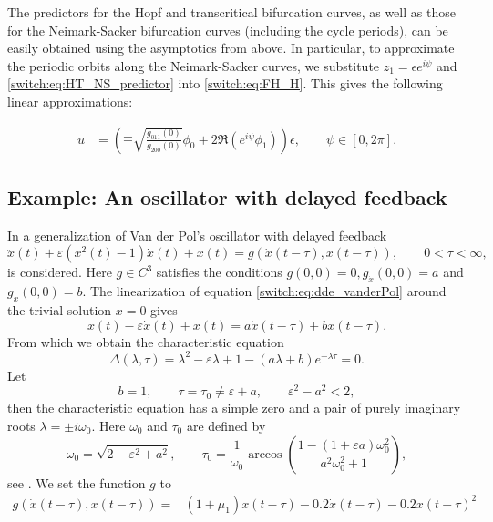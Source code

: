 \begin{subappendices}
The predictors for the Hopf and transcritical bifurcation curves, as well as
those for the Neimark-Sacker bifurcation curves (including the cycle periods),
can be easily obtained using the asymptotics from
above. In particular, to
approximate the periodic orbits along the Neimark-Sacker curves, we substitute
$z_{1}=\epsilon e^{i\psi}$ and \cref{switch:eq:HT_NS_predictor} into \cref{switch:eq:FH_H}.
This gives the following linear approximations:

\begin{align*}
u & =\left(\mp \sqrt{\frac{ g_{011}(0)}{g_{200}(0)}}\phi_0
+2\Re\left(e^{i\psi}\phi_{1}\right)\right)\epsilon, \qquad \psi\in[0,2\pi].
\end{align*}

\subsection{Example: An oscillator with delayed feedback}\label{switch:sec:HT_example}
In \cite{Bramburger2014} a generalization of Van der Pol's oscillator with delayed feedback
\begin{equation}\label{switch:eq:dde_vanderPol}
\ddot{x}(t)+\varepsilon(x^{2}(t)-1)\dot{x}(t)+x(t)=g(\dot{x}(t-\tau),x(t-\tau)),
\qquad 0<\tau<\infty,
\end{equation}
is considered. Here $g\in C^{3}$ satisfies the conditions $g(0,0)=0,g_{\dot{x}}(0,0)=a$ and $g_{x}(0,0)=b$. The linearization of equation \cref{switch:eq:dde_vanderPol} around the trivial solution $x=0$ gives
\[
\ddot{x}(t)-\varepsilon\dot{x}(t)+x(t)=a\dot{x}(t-\tau)+bx(t-\tau).
\]
From which we obtain the characteristic equation
\[
\Delta(\lambda,\tau)=\lambda^{2}-\varepsilon\lambda+1-(a\lambda+b)e^{-\lambda\tau}=0.
\]
Let
\begin{equation}
b=1,\qquad\tau=\tau_{0}\neq\varepsilon+a,\qquad\varepsilon^{2}-a^{2}<2,\label{switch:eq:fold-Hopf_conditions}
\end{equation}
then the characteristic equation has a simple zero and a pair of purely imaginary roots $\lambda=\pm i\omega_{0}$. Here $\omega_{0}$ and $\tau_{0}$ are defined by
\[
\omega_{0}=\sqrt{2-\varepsilon^{2}+a^{2}},\qquad\tau_{0}=\frac{1}{\omega_{0}}\arccos\left(\dfrac{1-(1+\varepsilon a)\omega_{0}^{2}}{a^{2}\omega_{0}^{2}+1}\right),
\]
see \cite[Proposition 2.1]{Bramburger2014}. We set the function $g$ to
\begin{align*}
g(\dot{x}(t-\tau),x(t-\tau))=&(1+\mu_{1}) x(t-\tau)-0.2 \dot{x}(t-\tau)-0.2 x(t-\tau)^{2}\\

\end{align*}
\end{subappendices}
